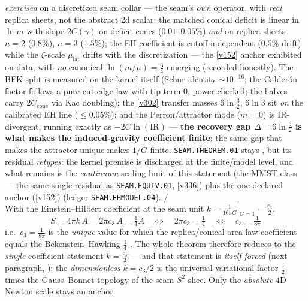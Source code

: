 \documentclass[11pt,a4paper]{article}
\newcommand{\cthree}{c_3}
\begin{document}
\begin{gapbox}
\emph{exercised} on a discretized seam collar --- the seam's \emph{own} operator, with
\emph{real} replica sheets, not the abstract 2d scalar: the matched conical deficit is linear
in $\ln m$ with slope $2C(\gamma)$ on deficit cones ($0.01$--$0.05\%$) \emph{and} on replica
sheets $n{=}2$ ($0.8\%$), $n{=}3$ ($1.5\%$); the EH coefficient is cutoff-independent
($0.5\%$ drift) while the $\zeta$-scale $\mu_{\mathrm{lat}}$ drifts with the discretization
--- the \vref{v152} anchor exhibited on data, with \emph{no} canonical
$\ln(m/\mu){=}\tfrac34$ emerging (recorded honestly). The BFK split is measured on the
kernel itself (Schur identity ${\sim}10^{-16}$; the Calder\'on factor follows a pure
cut-edge law with tip term $0$, power-checked; the halves carry $2C_{\mathrm{cone}}$ via Kac
doubling); the \vref{v302} transfer masses $6\ln\tfrac32$, $6\ln 3$ sit \emph{on} the
calibrated EH line ($\le0.05\%$); and the Perron/attractor mode ($m{=}0$) is IR-divergent,
running exactly as $-2C\ln(\mathrm{IR})$ --- \textbf{the recovery gap
$\Delta{=}6\ln\tfrac32$ is what makes the induced-gravity coefficient finite}: the same gap
that makes the attractor unique makes $1/G$ finite. \texttt{SEAM.THEOREM.01} stays \mO, but
its residual \emph{retypes}: the kernel premise is discharged at the finite/model level, and
what remains is the \emph{continuum} scaling limit of this statement (the MMST class --- the
same single residual as \texttt{SEAM.EQUIV.01}, \vref{v336}) plus the one declared anchor
(\vref{v152}) (ledger \texttt{SEAM.EHMODEL.04}). \mE/\mO
\smallskip\\
With the Einstein--Hilbert coefficient at the seam unit
$k=\tfrac1{16\pi G}\big|_{G=1}=\tfrac{\cthree}2$,
\[
  \boxed{\ S=4\pi k\,A=2\pi\cthree\,A=\tfrac14 A\quad\Longleftrightarrow\quad 2\pi\cthree=\tfrac14\quad\Longleftrightarrow\quad \cthree=\tfrac1{8\pi}\ }
\]
i.e.\ $\cthree=\tfrac1{8\pi}$ is the \emph{unique} value for which the replica/conical area-law coefficient
equals the Bekenstein--Hawking $\tfrac14$ \mE. The whole theorem therefore reduces to the \emph{single}
coefficient statement $k=\tfrac{\cthree}2$ --- and that statement is \emph{itself forced} (next paragraph,
): the \emph{dimensionless} $k=\cthree/2$ is the universal variational factor
$\tfrac12$ times the Gauss--Bonnet topology of the seam $S^2$ slice. Only the \emph{absolute} $4$D Newton
scale stays an anchor.


\end{gapbox}
\end{document}
